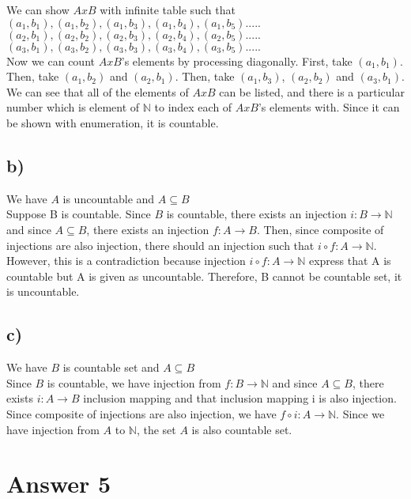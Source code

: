 \documentclass[12pt]{article}
\begin{document}
We can show $AxB$ with infinite table such that \\
$(a_1,b_1),(a_1,b_2),(a_1,b_3),(a_1,b_4),(a_1,b_5).....$ \\
$(a_2,b_1),(a_2,b_2),(a_2,b_3),(a_2,b_4),(a_2,b_5).....$ \\
$(a_3,b_1),(a_3,b_2),(a_3,b_3),(a_3,b_4),(a_3,b_5).....$ \\

Now we can count $AxB$'s elements by processing diagonally. First, take $(a_1,b_1)$. Then, take $(a_1,b_2)$ and $(a_2,b_1)$. Then, take $(a_1,b_3)$, $(a_2,b_2)$ and $(a_3,b_1)$. We can see that all of the elements of $AxB$ can be listed, and there is a particular number which is element of $\mathbb{N}$ to index each of $AxB$'s elements with. Since it can be shown with enumeration, it is countable.
 
\subsection*{b)}

We have $A$ is uncountable and $A \subseteq B$ \\
Suppose B is countable. Since $B$ is countable, there exists an injection $i : B \rightarrow  \mathbb{N}$ and since $A \subseteq B$, there exists an injection $f : A  \rightarrow B$. Then, since composite of injections are also injection, there should an injection such that $i \circ f : A \rightarrow \mathbb{N}$. However, this is a contradiction because injection $i \circ f : A \rightarrow \mathbb{N}$ express that A is countable but A is given as uncountable. Therefore, B cannot be countable set, it is uncountable.



\subsection*{c)}

We have $B$ is countable set and $A \subseteq B$ \\
Since $B$ is countable, we have injection from $f:B \rightarrow \mathbb{N}$ and since $A \subseteq B$, there exists $ i: A \rightarrow B$ inclusion mapping and that inclusion mapping i is also injection. Since composite of injections are also injection, we have $f \circ i : A \rightarrow \mathbb{N}$. Since we have injection from $A$ to $\mathbb{N}$, the set $A$ is also countable set.


\section*{Answer 5}
\end{document}
